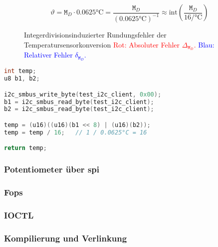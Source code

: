 \begin{equation}
    \vartheta = \texttt{M}_D \cdot 0.0625\si{\celsius} = \frac{\texttt{M}_D}{\left(0.0625\si{\celsius}\right)^{-1}} \approx \text{int}\left(\frac{\texttt{M}_D}{16\si{\per\celsius}}\right)
    \label{eq:temp-convert}
\end{equation}
\begin{figure}
    \centering
    \caption[Integerdivisionsinduzierter Rundungsfehler]{Integerdivisionsinduzierter Rundungsfehler der Temperatursensorkonversion
    \textcolor{red}{Rot: Absoluter Fehler $\Delta_{\texttt{M}_D}$.}
    \textcolor{blue}{Blau: Relativer Fehler $\delta_{\texttt{M}_D}$.}
    }
    \label{fig:rounding-err}
\end{figure}
\begin{lstlisting}[language=C]
int temp;
u8 b1, b2;

i2c_smbus_write_byte(test_i2c_client, 0x00);
b1 = i2c_smbus_read_byte(test_i2c_client);
b2 = i2c_smbus_read_byte(test_i2c_client);

temp = (u16)((u16)(b1 << 8) | (u16)(b2));
temp = temp / 16;	// 1 / 0.0625°C = 16

return temp;
\end{lstlisting}

\subsubsection{Potentiometer über \acrshort{spi}}
\subsubsection{Fops}
\subsubsection{IOCTL}
\subsubsection{Kompilierung und Verlinkung}
